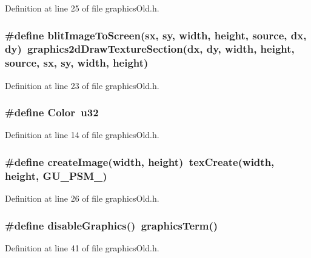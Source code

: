 Definition at line 25 of file graphics\-Old.h.
\subsubsection{\setlength{\rightskip}{0pt plus 5cm}\#define blit\-Image\-To\-Screen(sx, sy, width, height, source, dx, dy)~graphics2d\-Draw\-Texture\-Section(dx, dy, width, height, source, sx, sy, width, height)}\label{graphicsOld_8h_67325319d3c8d2e7f162e226499bb6bb}




Definition at line 23 of file graphics\-Old.h.
\subsubsection{\setlength{\rightskip}{0pt plus 5cm}\#define Color~u32}\label{graphicsOld_8h_2f17017b1ef643696b678a0703f0f166}




Definition at line 14 of file graphics\-Old.h.
\subsubsection{\setlength{\rightskip}{0pt plus 5cm}\#define create\-Image(width, height)~tex\-Create(width, height, GU\_\-PSM\_)}\label{graphicsOld_8h_e2cba7c145720c8a9accfa917452a8b3}




Definition at line 26 of file graphics\-Old.h.
\subsubsection{\setlength{\rightskip}{0pt plus 5cm}\#define disable\-Graphics()~graphics\-Term()}\label{graphicsOld_8h_9805a7b4816ff499332bc57b352a458c}




Definition at line 41 of file graphics\-Old.h.
